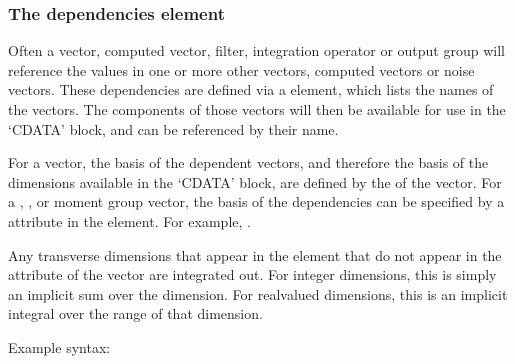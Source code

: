 \documentclass[letterpaper,10pt,english]{sphinxmanual}
\begin{document}
\ignorespaces 

\subsubsection{The dependencies element}
\label{\detokenize{reference_elements:the-dependencies-element}}\label{\detokenize{reference_elements:dependencies}}\label{\detokenize{reference_elements:index-54}}
\sphinxAtStartPar
Often a vector, computed vector, filter, integration operator or output group will reference the values in one or more other vectors, computed vectors or noise vectors.  These dependencies are defined via a  element, which lists the names of the vectors.  The components of those vectors will then be available for use in the ‘CDATA’ block, and can be referenced by their name.

\ignorespaces 
\sphinxAtStartPar
For a vector, the basis of the dependent vectors, and therefore the basis of the dimensions available in the ‘CDATA’ block, are defined by the  of the vector.  For a ,  , or moment group vector, the basis of the dependencies can be specified by a  attribute in the  element.  For example, .

\sphinxAtStartPar
Any transverse dimensions that appear in the  element that do not appear in the  attribute of the vector are integrated out.  For integer dimensions, this is simply an implicit sum over the dimension.  For real\sphinxhyphen{}valued dimensions, this is an implicit integral over the range of that dimension.

\sphinxAtStartPar
Example syntax:
\end{document}
